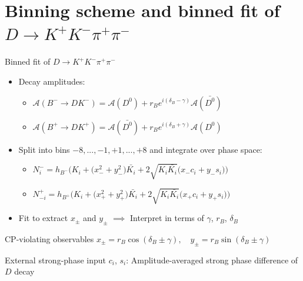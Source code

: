 \documentclass{beamer}
\begin{document}
\section{Binning scheme and binned fit of \texorpdfstring{$D\to K^+K^-\pi^+\pi^-$}{D to K+K-pi+pi-}}
\begin{frame}{Binned fit of $D\to K^+K^-\pi^+\pi^-$}
  \begin{itemize}
    \item{Decay amplitudes:}
    \begin{itemize}
      \item{$\mathcal{A}(B^-\to DK^-) = \mathcal{A}(D^0) + r_Be^{i(\delta_B - \gamma)}\mathcal{A}(\bar{D^0})$}
      \item{$\mathcal{A}(B^+\to DK^+) = \mathcal{A}(\bar{D^0}) + r_Be^{i(\delta_B + \gamma)}\mathcal{A}(D^0)$}
    \end{itemize}
    \item{Split into bins $-8, ..., -1, +1, ..., +8$ and integrate over phase space:}
    \begin{itemize}
      \item{$N^-_i = h_{B^-}\Big(K_i + \big(x_-^2 + y_-^2\big)\bar{K_i} + 2\sqrt{K_i\bar{K_i}}\big(x_-c_i + y_-s_i\big)\Big)$}
      \item{$N^+_{-i} = h_{B^+}\Big(K_i + \big(x_+^2 + y_+^2\big)\bar{K_i} + 2\sqrt{K_i\bar{K_i}}\big(x_+c_i + y_+s_i\big)\Big)$}
    \end{itemize}
    \item{Fit to extract $x_\pm$ and $y_\pm$ $\implies$ Interpret in terms of $\gamma$, $r_B$, $\delta_B$}
  \end{itemize}
  \begin{block}{CP-violating observables}
    $x_\pm = r_B\cos(\delta_B\pm\gamma), \quad y_\pm = r_B\sin(\delta_B\pm\gamma)$
  \end{block}
  \begin{block}{External strong-phase input}
    $c_i$, $s_i$: Amplitude-averaged strong phase difference of $D$ decay
  \end{block}
\end{frame}
\end{document}

